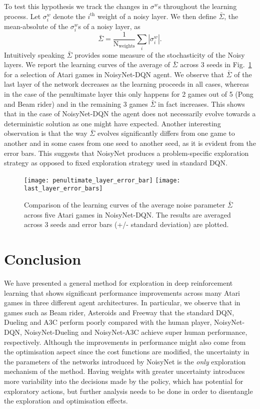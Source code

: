 \documentclass{article}
\newcommand{\algoinit}{NoisyNet}
\begin{document}
To test this hypothesis we track the changes in $\sigma^w$s throughout the learning process. Let  $\sigma^w_i$ denote the $i^{\text{th}}$ weight of a noisy layer. We then define $\bar \Sigma$, the mean-absolute of the $\sigma^w_i$s of a noisy layer, as
\begin{equation}
\bar \Sigma = \frac{1}{\mathrm{N_{weights}}}\sum_i|\sigma^w_i|.
\end{equation}
Intuitively speaking $\bar \Sigma$ provides some measure of the stochasticity of the Noisy layers. We report the learning curves of the average of $\bar \Sigma$ across $3$ seeds in Fig.~\ref{fig:sigma_curves} for a selection of Atari games in NoisyNet-DQN agent. We observe that $\bar \Sigma$ of the last layer of the network decreases as the learning proceeds in all cases, whereas in the case of the penultimate layer this only happens for 2 games out of 5 (Pong and Beam rider) and in the remaining 3 games $\bar \Sigma$ in fact increases. This shows that in the case of NoisyNet-DQN the agent does not necessarily evolve towards a deterministic solution as one might have expected. Another interesting observation is that the way $\bar \Sigma$ evolves significantly differs from one game to another and in some cases from one seed to another seed, as it is evident from the error bars. This suggests that NoisyNet produces a problem-specific exploration strategy as opposed to fixed exploration strategy used in standard DQN.      
\begin{centering}
\begin{figure}[ht!]
    \texttt{[image: penultimate\_layer\_error\_bar]}
    \texttt{[image: last\_layer\_error\_bars]}
    \caption{Comparison of the learning curves of the average noise parameter $\bar\Sigma$ across five Atari games in NoisyNet-DQN. The results are averaged across 3 seeds and error bars (+/- standard deviation) are plotted.}
    \label{fig:sigma_curves} 
\end{figure}
\end{centering} 
\section{Conclusion}
\label{sec:conclusion}
We have presented a general method for exploration in deep reinforcement learning that shows significant performance improvements across many Atari games in three different agent architectures. In particular, we observe that in games such as Beam rider, Asteroids and Freeway that the standard DQN, Dueling and A3C perform poorly compared with the human player, \algoinit{}-DQN, \algoinit{}-Dueling  and \algoinit{}-A3C achieve super human performance, respectively. Although the improvements in performance might also come from the optimisation aspect since the cost functions are modified, the uncertainty in the parameters of the networks introduced by NoisyNet is the \textit{only} exploration mechanism of the method. Having weights with greater uncertainty introduces more variability into the decisions made by the policy, which has potential for exploratory actions, but further analysis needs to be done in order to disentangle the exploration and optimisation effects. 
 
\end{document}

